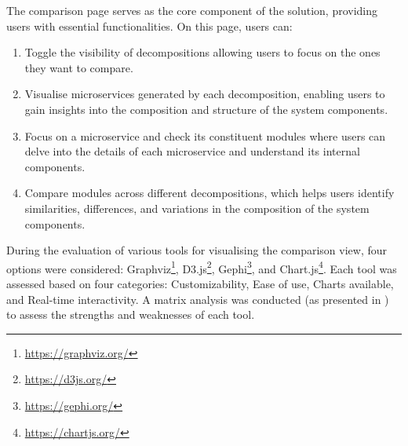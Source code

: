 The comparison page serves as the core component of the solution, providing
users with essential functionalities. On this page, users can:

\begin{enumerate}
  \item Toggle the visibility of decompositions allowing users to focus on the
    ones they want to compare.
  \item Visualise microservices generated by each decomposition, enabling users
    to gain insights into the composition and structure of the system
    components.
  \item Focus on a microservice and check its constituent modules where users
    can delve into the details of each microservice and understand its internal
    components.
  \item Compare modules across different decompositions, which helps users
    identify similarities, differences, and variations in the composition of
    the system components.
\end{enumerate}

During the evaluation of various tools for visualising the comparison view,
four options were considered: Graphviz\footnote{\url{https://graphviz.org/}},
D3.js\footnote{\url{https://d3js.org/}},
Gephi\footnote{\url{https://gephi.org/}}, and
Chart.js\footnote{\url{https://chartjs.org/}}. Each tool was assessed based on
four categories: Customizability, Ease of use, Charts available, and Real-time
interactivity. A matrix analysis was conducted (as presented in
) to assess the strengths and
weaknesses of each tool.

